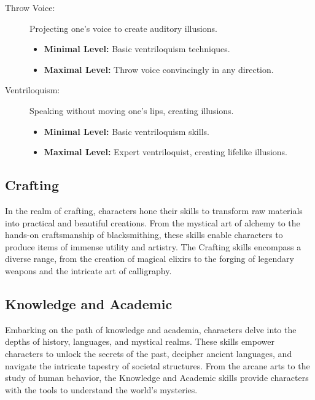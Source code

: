 \documentclass[12pt]{book}  %
\begin{document}
\begin{description}
    \item[Throw Voice:] Projecting one's voice to create auditory illusions.
        \begin{itemize}
            \item \textbf{Minimal Level:} Basic ventriloquism techniques.
            \item \textbf{Maximal Level:} Throw voice convincingly in any direction.
        \end{itemize}

    \item[Ventriloquism:] Speaking without moving one's lips, creating illusions.
        \begin{itemize}
            \item \textbf{Minimal Level:} Basic ventriloquism skills.
            \item \textbf{Maximal Level:} Expert ventriloquist, creating lifelike illusions.
        \end{itemize}
\end{description}

\subsection{\textbf{Crafting}}

In the realm of crafting, characters hone their skills to transform raw materials into practical and beautiful creations. From the mystical art of alchemy to the hands-on craftsmanship of blacksmithing, these skills enable characters to produce items of immense utility and artistry. The Crafting skills encompass a diverse range, from the creation of magical elixirs to the forging of legendary weapons and the intricate art of calligraphy.

\subsection{\textbf{Knowledge and Academic}}

Embarking on the path of knowledge and academia, characters delve into the depths of history, languages, and mystical realms. These skills empower characters to unlock the secrets of the past, decipher ancient languages, and navigate the intricate tapestry of societal structures. From the arcane arts to the study of human behavior, the Knowledge and Academic skills provide characters with the tools to understand the world's mysteries.
\end{document}
